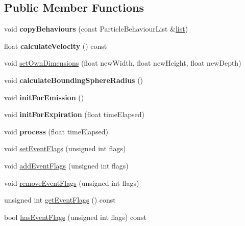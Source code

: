 \subsection*{Public Member Functions}
\begin{DoxyCompactItemize}
\item 
\mbox{\label{structPUParticle3D_aece3edfc9aeb3b7daa4bf332b93d4119}} 
void {\bfseries copy\+Behaviours} (const Particle\+Behaviour\+List \&\hyperlink{protocollist-p}{list})
\item 
\mbox{\label{structPUParticle3D_a4bae0130f86f84e7760a678aa2ff8c81}} 
float {\bfseries calculate\+Velocity} () const
\item 
void \hyperlink{structPUParticle3D_a4420273997df8552c431f41bcb6250d6}{set\+Own\+Dimensions} (float new\+Width, float new\+Height, float new\+Depth)
\item 
\mbox{\label{structPUParticle3D_ac618288503487ae5cda102e498be0f89}} 
void {\bfseries calculate\+Bounding\+Sphere\+Radius} ()
\item 
\mbox{\label{structPUParticle3D_af9f22cfbfbb8f7c2212c711ee40c3482}} 
void {\bfseries init\+For\+Emission} ()
\item 
\mbox{\label{structPUParticle3D_ac1fb31e3f12ff40c294d750f43fc4f94}} 
void {\bfseries init\+For\+Expiration} (float time\+Elapsed)
\item 
\mbox{\label{structPUParticle3D_a8b7a53a1c9e430d534541e8378883c9c}} 
void {\bfseries process} (float time\+Elapsed)
\item 
void \hyperlink{structPUParticle3D_a5110d80e36a32b2d5161dd2a5a5e8fb7}{set\+Event\+Flags} (unsigned int flags)
\item 
void \hyperlink{structPUParticle3D_a773a59d4e9b2c7f89486b0c8168a8330}{add\+Event\+Flags} (unsigned int flags)
\item 
void \hyperlink{structPUParticle3D_a561b071d395cd92b8ea688acda6aa12a}{remove\+Event\+Flags} (unsigned int flags)
\item 
unsigned int \hyperlink{structPUParticle3D_af1eea76d75ae71217e6b3c6992c76e3b}{get\+Event\+Flags} () const
\item 
bool \hyperlink{structPUParticle3D_ac66551a0117e3a867f58a34bb228aefb}{has\+Event\+Flags} (unsigned int flags) const

\end{DoxyCompactItemize}
